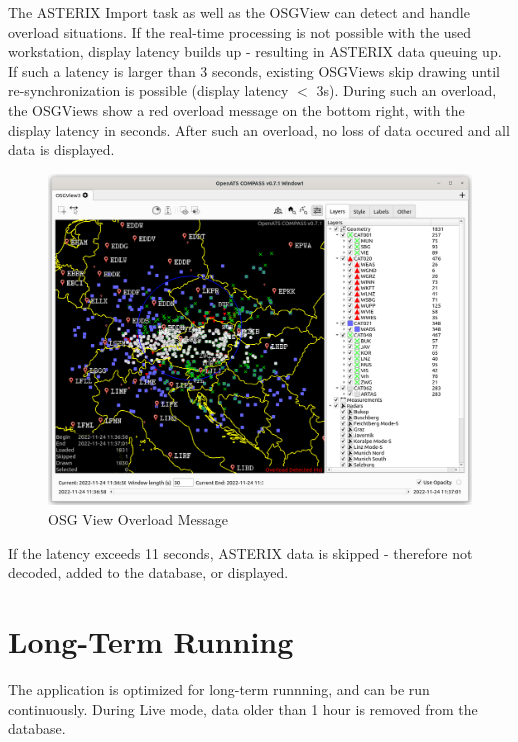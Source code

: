 The ASTERIX Import task as well as the OSGView can detect and handle overload situations. If the real-time processing is not possible with the used workstation, display latency builds up - resulting in ASTERIX data queuing up. \\

If such a latency is larger than 3 seconds,  existing OSGViews skip drawing until re-synchronization is possible (display latency $<$ 3s). During such an overload, the OSGViews show a red overload message on the bottom right, with the display latency in seconds. After such an overload, no loss of data occured and all data is displayed. \\

\begin{figure}[H]
    \hspace*{-2.5cm}
    \includegraphics[width=19cm,frame]{figures/osgview_overload.png}
  \caption{OSG View Overload Message}
\end{figure} 

If the latency exceeds 11 seconds, ASTERIX data is skipped - therefore not decoded, added to the database, or displayed.

\section{Long-Term Running}

The application is optimized for long-term runnning, and can be run continuously. During Live mode, data older than 1 hour is removed from the database. \\

